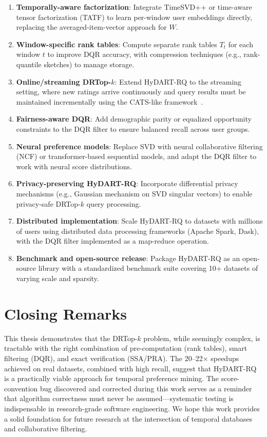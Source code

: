 \begin{enumerate}
  \item \textbf{Temporally-aware factorization}: Integrate TimeSVD++ or time-aware tensor factorization (TATF) to learn per-window user embeddings directly, replacing the averaged-item-vector approach for $W$.
  \item \textbf{Window-specific rank tables}: Compute separate rank tables $T_t$ for each window $t$ to improve DQR accuracy, with compression techniques (e.g., rank-quantile sketches) to manage storage.
  \item \textbf{Online/streaming DRTop-$k$}: Extend HyDART-RQ to the streaming setting, where new ratings arrive continuously and query results must be maintained incrementally using the CATS-like framework~\cite{mouratidis2006continuous}.
  \item \textbf{Fairness-aware DQR}: Add demographic parity or equalized opportunity constraints to the DQR filter to ensure balanced recall across user groups.
  \item \textbf{Neural preference models}: Replace SVD with neural collaborative filtering (NCF) or transformer-based sequential models, and adapt the DQR filter to work with neural score distributions.
  \item \textbf{Privacy-preserving HyDART-RQ}: Incorporate differential privacy mechanisms (e.g., Gaussian mechanism on SVD singular vectors) to enable privacy-safe DRTop-$k$ query processing.
  \item \textbf{Distributed implementation}: Scale HyDART-RQ to datasets with millions of users using distributed data processing frameworks (Apache Spark, Dask), with the DQR filter implemented as a map-reduce operation.
  \item \textbf{Benchmark and open-source release}: Package HyDART-RQ as an open-source library with a standardized benchmark suite covering 10+ datasets of varying scale and sparsity.
\end{enumerate}

\section{Closing Remarks}

This thesis demonstrates that the DRTop-$k$ problem, while seemingly complex, is tractable with the right combination of pre-computation (rank tables), smart filtering (DQR), and exact verification (SSA/PRA). The 20--22$\times$ speedups achieved on real datasets, combined with high recall, suggest that HyDART-RQ is a practically viable approach for temporal preference mining. The score-convention bug discovered and corrected during this work serves as a reminder that algorithm correctness must never be assumed---systematic testing is indispensable in research-grade software engineering. We hope this work provides a solid foundation for future research at the intersection of temporal databases and collaborative filtering.

